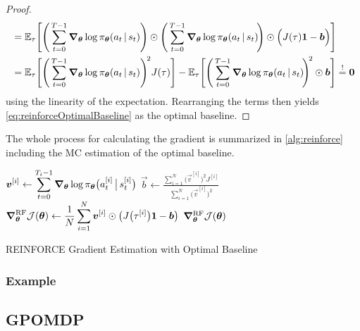 \begin{proof}
\begin{align}
						&= \mathbb{E}_\tau\Biggl[ \Biggl(\, \sum_{t = 0}^{T - 1} \grad_{\bm{\theta}} \log \pi_{\bm{\theta}}(a_t \,\vert\, s_t) \Biggr) \odot \Biggl(\, \sum_{t = 0}^{T - 1} \grad_{\bm{\theta}} \log \pi_{\bm{\theta}}(a_t \,\vert\, s_t) \!\Biggr) \odot \Bigl( J(\tau) \bm{1} - \bm{b} \Bigr) \Biggr] \\
						&= \mathbb{E}_\tau\Biggl[ \Biggl(\, \sum_{t = 0}^{T - 1} \grad_{\bm{\theta}} \log \pi_{\bm{\theta}}(a_t \,\vert\, s_t) \Biggr)^{\!2} J(\tau) \Biggr] - \mathbb{E}_\tau\Biggl[ \Biggl(\, \sum_{t = 0}^{T - 1} \grad_{\bm{\theta}} \log \pi_{\bm{\theta}}(a_t \,\vert\, s_t) \!\Biggr)^{\!2} \odot \bm{b} \Biggr]
						 \overset{!}{=} \bm{0}
				\end{align}
				using the linearity of the expectation. Rearranging the terms then yields \eqref{eq:reinforceOptimalBaseline} as the optimal baseline.
			\end{proof}

			The whole process for calculating the gradient is summarized in \autoref{alg:reinforce} including the \ac{MC} estimation of the optimal baseline.

			\begin{algorithm}  \DontPrintSemicolon
				\(\displaystyle \bm{v}^{[i]} \gets \sum_{t = 0}^{T_i - 1} \grad_{\bm{\theta}} \log \pi_{\bm{\theta}}\bigl( a_t^{[i]} \,\big\vert\, s_t^{[i]} \bigr) \) \;
				\(\displaystyle \vec{b} \gets \frac{\sum_{i = 1}^{N} \bigl(\vec{v}^{[i]}\bigr)^2 J^{[i]}}{\sum_{i = 1}^{N} \bigl(\vec{v}^{[i]}\bigr)^2} \)  \quad{}
				\(\displaystyle \grad_{\bm{\theta}}^\mathrm{RF} \mathcal{J}(\bm{\theta}) \gets \frac{1}{N} \sum_{i = 1}^{N} \bm{v}^{[i]} \odot \bigl( J\bigl(\tau^{[i]}\bigr) \bm{1} - \bm{b} \bigr) \)  \quad{}
				\Return \( \grad_{\bm{\theta}}^\mathrm{RF} \mathcal{J}(\bm{\theta}) \) \;
				\caption{REINFORCE Gradient Estimation with Optimal Baseline}
				\label{alg:reinforce}
			\end{algorithm}

			\subsubsection{Example} %

		\subsection{\acs{GPOMDP}}
		 \label{subsec:gpomdp}


